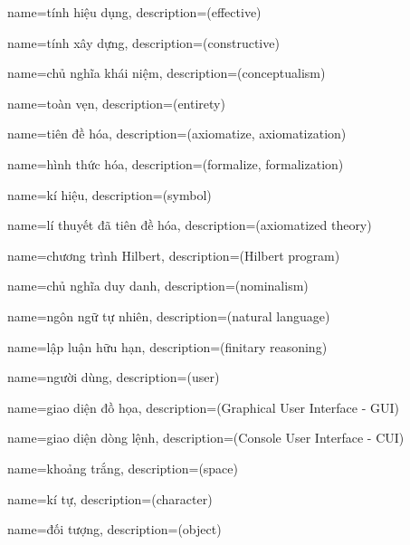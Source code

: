 {
    name={tính hiệu dụng},
    description={(effective)}
}

{
    name={tính xây dựng},
    description={(constructive)}
}

{
    name={chủ nghĩa khái niệm},
    description={(conceptualism)}
}

{
    name={toàn vẹn},
    description={(entirety)}
}

{
    name={tiên đề hóa},
    description={(axiomatize, axiomatization)}
}

{
    name={hình thức hóa},
    description={(formalize, formalization)}
}

{
    name={kí hiệu},
    description={(symbol)}
}

{
    name={lí thuyết đã tiên đề hóa},
    description={(axiomatized theory)}
}

{
    name={chương trình Hilbert},
    description={(Hilbert program)}
}

{
    name={chủ nghĩa duy danh},
    description={(nominalism)}
}

{
    name={ngôn ngữ tự nhiên},
    description={(natural language)}
}

{
    name={lập luận hữu hạn},
    description={(finitary reasoning)}
}


{
    name={người dùng},
    description={(user)}
}

{
    name={giao diện đồ họa},
    description={(Graphical User Interface - GUI)}
}

{
    name={giao diện dòng lệnh},
    description={(Console User Interface - CUI)}
}

{
    name={khoảng trắng},
    description={(space)}
}

{
    name={kí tự},
    description={(character)}
}

{
    name={đối tượng},
    description={(object)}
}

